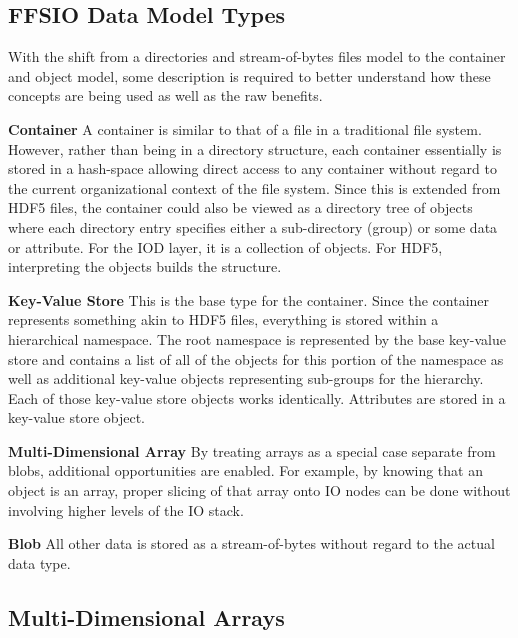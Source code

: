 \documentclass{sig-alt-gov2}
\begin{document}
\subsection{FFSIO Data Model Types}
\label{sec:data-model}

With the shift from a directories and stream-of-bytes files model to the
container and object model, some description is required to better understand
how these concepts are being used as well as the raw benefits.

\textbf{Container}
A container is similar to that of a file in a traditional file system. However,
rather than being in a directory structure, each container essentially is
stored in a hash-space allowing direct access to
any container without regard to the current organizational context of the
file system.
%
Since this is extended from HDF5 files, the container could also be
viewed as a directory tree of objects where each directory entry specifies
either a sub-directory (group) or some data or attribute. For the IOD layer, it
is a collection of objects. For HDF5, interpreting the objects builds the
structure.

\textbf{Key-Value Store}
This is the base type for the container. Since the container represents
something akin to HDF5 files, everything is stored within a hierarchical
namespace. The root namespace is represented by the base key-value store and
contains a list of all of the objects for this portion of the namespace as well
as additional key-value objects representing sub-groups for the hierarchy. Each
of those key-value store objects works identically.  Attributes are stored in a
key-value store object.

\textbf{Multi-Dimensional Array}
By treating arrays as a special case separate from blobs, additional
opportunities are enabled. For example, by knowing that an object is an array,
proper slicing of that array onto IO nodes can be done without involving higher
levels of the IO stack.

\textbf{Blob}
All other data is stored as a stream-of-bytes without regard to the actual
data type.

\subsection{Multi-Dimensional Arrays}
\end{document}
